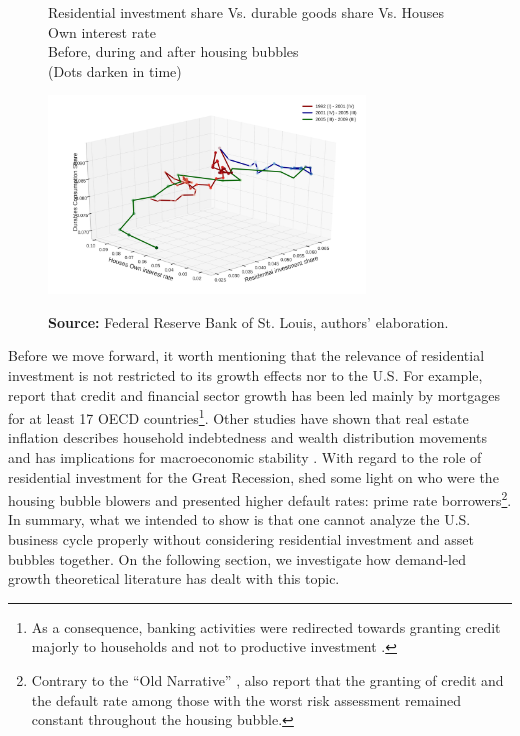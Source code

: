 \documentclass[11pt]{article}
\begin{document}
\begin{figure}[htb]
    \centering
        \caption{Residential investment share Vs. durable goods share Vs. Houses Own interest rate\\\centering Before, during and after housing bubbles\\\centering (Dots darken in  time)} 
    \includegraphics[width = 0.75\textwidth]{./figs/Durables_3D.png}
    \label{fig:Durables_cycles}
    \caption*{\textbf{Source:} Federal Reserve Bank of St. Louis, authors’ elaboration.}
\end{figure}



Before we move forward, it worth mentioning that the relevance of residential investment is not restricted to its growth effects nor to the U.S. 
For example, \textcite{jorda_great_2016} report that credit and financial sector growth has been led mainly by mortgages for at least 17 OECD countries\footnote{As a consequence, banking activities were redirected towards granting credit majorly to households and not to productive investment \cites{erturk_banks_2007}{kohl_more_2018}.}. 
Other studies have shown that real estate inflation describes household indebtedness and wealth distribution movements and has implications for macroeconomic stability \cites{ryoo_household_2016}{stockhammer_debt-driven_2016}{barnes_private_2016}{johnston_global_2017}{mian_household_2017}{anderson_politics_2020}{fuller_housing_2020}. 
With regard to the role of residential investment for the Great Recession, \textcite{albanesi_credit_2017} shed some light on who were the housing bubble blowers and presented higher default rates: prime rate borrowers\footnote{Contrary to the ``Old Narrative'' \cite{mian_consequences_2009},  \textcite{albanesi_credit_2017}  also report that the granting of credit and the default rate among those with the worst risk assessment remained constant throughout the housing bubble.}.
In summary, what we intended to show is that one cannot analyze the U.S. business cycle properly without considering residential investment and asset bubbles together.
On the following section, we investigate how demand-led growth theoretical literature has dealt with this topic.
\end{document}
